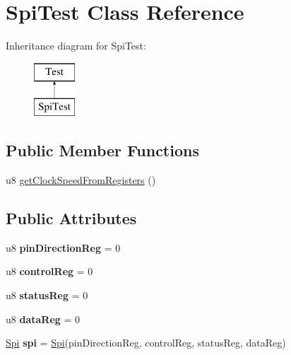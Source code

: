 \hypertarget{class_spi_test}{}\section{Spi\+Test Class Reference}
\label{class_spi_test}
Inheritance diagram for Spi\+Test\+:\begin{figure}[H]
\begin{center}
\leavevmode
\includegraphics[height=2.000000cm]{class_spi_test}
\end{center}
\end{figure}
\subsection*{Public Member Functions}
\begin{DoxyCompactItemize}
\item 
u8 \mbox{\hyperlink{class_spi_test_a6f3260038241bf80545cddf4e1d73130}{get\+Clock\+Speed\+From\+Registers}} ()
\end{DoxyCompactItemize}
\subsection*{Public Attributes}
\begin{DoxyCompactItemize}
\item 
\mbox{\label{class_spi_test_a2124422a4366e5d93c187f28b501d329}} 
u8 {\bfseries pin\+Direction\+Reg} = 0
\item 
\mbox{\label{class_spi_test_a880e38b17b7c677f4bb8f080d9c456ce}} 
u8 {\bfseries control\+Reg} = 0
\item 
\mbox{\label{class_spi_test_a699992d86eb612c5075cb6c20fbc7ee3}} 
u8 {\bfseries status\+Reg} = 0
\item 
\mbox{\label{class_spi_test_aa67bba41833d0757d6d60f24102313bf}} 
u8 {\bfseries data\+Reg} = 0
\item 
\mbox{\label{class_spi_test_a2cb7044aa4c2cf119b0ee7338e0e66b6}} 
\mbox{\hyperlink{class_spi}{Spi}} {\bfseries spi} = \mbox{\hyperlink{class_spi}{Spi}}(pin\+Direction\+Reg, control\+Reg, status\+Reg, data\+Reg)
\end{DoxyCompactItemize}


